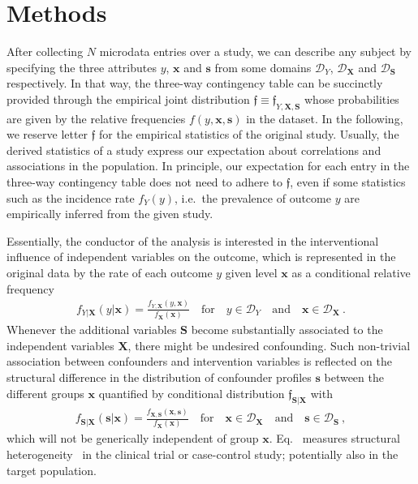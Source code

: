 \documentclass[10pt]{article}
\renewcommand{\eqref}{Eq.~\originaleqref}
\newcommand{\equ}[1]{\begin{gather} #1 \end{gather}}
\newcommand{\quads}[1]{\quad #1 \quad}
\newcommand{\qand}{\quad \text{and} \quad}
\newcommand{\prob}[1]{\mathfrak{#1}}
\begin{document}
\section{Methods}


After collecting  $N$ microdata entries  over a study, we can describe  any subject by specifying the 
three attributes 
$y$, $\boldsymbol x$ and $\boldsymbol s$ from some domains $\mathcal D_Y$, $\mathcal D_{\boldsymbol X}$ and $\mathcal D_{\boldsymbol S}$ respectively.
In that  way, the three-way contingency table can be succinctly provided through the empirical joint distribution $\prob f\equiv \prob f_{Y,\boldsymbol X,\boldsymbol S}$ whose probabilities are given by the relative frequencies $ f(y,\boldsymbol x,\boldsymbol s)$ in the dataset. In the following, we reserve letter $\prob f$ for the empirical statistics of the original study.
Usually, the derived  statistics of a study express our expectation about correlations and associations in the population.
In principle, our expectation for each entry in the three-way contingency table  does not need to adhere to $\prob f$, even if some statistics such as the incidence rate $f_Y(y)$, i.e.\ the prevalence of outcome $y$  are empirically inferred from the given study.


Essentially, the conductor of the analysis is  interested in the interventional  influence  of independent  variables on the outcome, which is represented in the original data by the rate of each outcome $y$ given level $\boldsymbol x$ as a conditional relative frequency
\equ{
\label{eq:InterventionCorrelation}
f_{Y\vert \boldsymbol X}(y\vert \boldsymbol x) = \frac{f_{Y,\boldsymbol X}(y,\boldsymbol x)}{f_{\boldsymbol X}(\boldsymbol x)}
\quads{\text{for}} y\in\mathcal D_Y \qand \boldsymbol x\in\mathcal D_{\boldsymbol X}~.
}
Whenever the additional variables $\boldsymbol S$ become substantially associated to the independent variables $\boldsymbol X$, there might be undesired confounding.
%
Such non-trivial association between confounders and intervention variables is reflected on the structural difference in the distribution  of confounder profiles $\boldsymbol s$ between the different groups $\boldsymbol x$ quantified by conditional distribution $\prob f_{\boldsymbol S\vert \boldsymbol X}$ with
\equ{
\label{eq:ConfounderDisparity}
f_{\boldsymbol S\vert \boldsymbol X} (\boldsymbol s\vert \boldsymbol x) = \frac{f_{\boldsymbol X,\boldsymbol S}(\boldsymbol x,\boldsymbol s)}{f_{\boldsymbol X}(\boldsymbol x)}
\quads{\text{for}} \boldsymbol  x\in\mathcal D_{\boldsymbol  X} \qand \boldsymbol s\in\mathcal D_{\boldsymbol S}
~,
}
which  will not be generically independent of group $\boldsymbol x$. \eqref{eq:ConfounderDisparity} measures structural heterogeneity~\cite{jager2008confounding,piantadosi2017clinical} in the clinical trial or case-control study; potentially also in the  target population.
\end{document}
